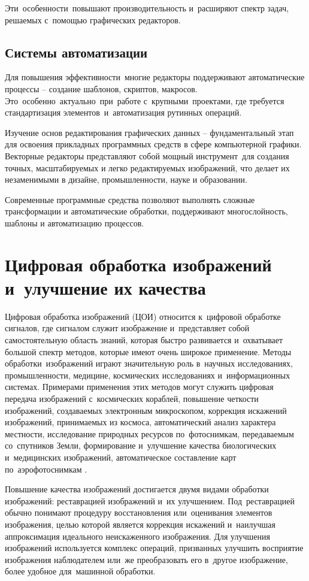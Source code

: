 \documentclass{ou}
\begin{document}
Эти~особенности~повышают производительность и~расширяют спектр задач, решаемых с~помощью графических редакторов.
\subsection{Системы автоматизации}
Для повышения эффективности~многие редакторы поддерживают автоматические процессы -- создание шаблонов, скриптов, макросов. Это~особенно~актуально~при~работе с~крупными~проектами, где требуется стандартизация элементов~и~автоматизация рутинных операций.

Изучение основ редактирования графических данных -- фундаментальный этап для освоения прикладных программных средств в сфере компьютерной графики. Векторные редакторы представляют собой мощный инструмент~для создания точных, масштабируемых и легко редактируемых изображений, что делает их незаменимыми в дизайне, промышленности, науке и образовании.

Современные программные средства позволяют выполнять сложные трансформации и автоматические обработки, поддерживают многослойность, шаблоны и автоматизацию процессов.
\newpage
\section{Цифровая обработка изображений и~улучшение их качества}
Цифровая обработка изображений (ЦОИ) относится к~цифровой обработке сигналов, где сигналом служит изображение и~представляет собой самостоятельную область знаний, которая быстро развивается и~охватывает большой спектр методов, которые имеют очень широкое применение. Методы обработки~изображений играют значительную роль в~научных исследованиях, промышленности, медицине, космических исследованиях и~информационных системах. Примерами применения этих методов могут служить цифровая передача изображений с~космических кораблей, повышение четкости изображений, создаваемых электронным микроскопом, коррекция искажений изображений, принимаемых из космоса, автоматический анализ характера местности, исследование природных ресурсов по~фотоснимкам, передаваемым со~спутников Земли, формирование и~улучшение качества биологических и~медицинских изображений, автоматическое составление карт по~аэрофотоснимкам \cite{exponenta}. 

Повышение качества изображений достигается двумя видами обработки изображений: реставрацией изображений и~их улучшением. Под~реставрацией обычно понимают процедуру восстановления или~оценивания элементов изображения, целью которой является коррекция искажений и~наилучшая аппроксимация идеального неискаженного изображения. Для улучшения изображений используется комплекс операций, призванных улучшить восприятие изображения наблюдателем или~же преобразовать его в~другое изображение, более удобное для~машинной обработки\cite{cyberleninka}. 
\end{document}
